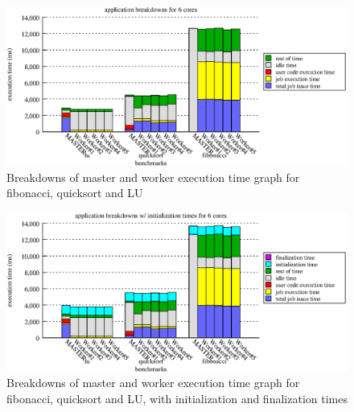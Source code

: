 \begin{figure}[!ht]
\includegraphics[width=\columnwidth]{figures/app_breakdowns_6cores}
\caption{Breakdowns of master and worker execution time graph for fibonacci, quicksort and LU}
\label{fig:app_breakdowns_6cores}
\end{figure}

\begin{figure}[!ht]
\includegraphics[width=\columnwidth]{figures/app_breakdowns_w_init}
\caption{Breakdowns of master and worker execution time graph for fibonacci, quicksort and LU, with initialization
and finalization times}
\label{fig:app_breakdowns_w_init}
\end{figure}

